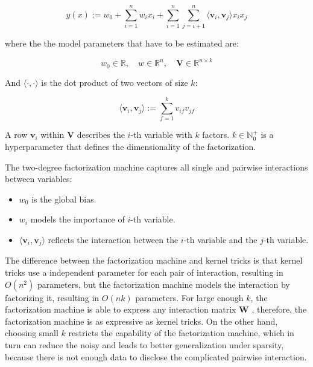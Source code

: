         \begin{equation}
        y(x) := w_0 + \sum_{i=1}^n w_i x_i + \sum_{i=1}^n\sum_{j=i+1}^n \langle \bm{v}_i, \bm{v}_j \rangle x_ix_j
        \label{eq:fm}
        \end{equation}

        where the the model parameters that have to be estimated are:

        \[
        w_0 \in \mathbb{R}, \quad w \in \mathbb{R}^n, \quad \bm{V} \in \mathbb{R}^{n \times k}
        \]

        And $\langle \cdot, \cdot \rangle$ is the dot product of two vectors of size $k$:

        \[
        \langle \bm{v}_i, \bm{v}_j \rangle := \sum_{f=1}^k v_{if}v_{jf}
        \]

        A row $\bm{v}_i$ within $\bm{V}$ describes the $i$-th variable with $k$ factors.
        $k \in \mathbb{N}_0^+$ is a hyperparameter that defines the dimensionality of the factorization.

        The two-degree factorization machine captures all single and pairwise interactions between variables:

        \begin{itemize}
            \item $w_0$ is the global bias.
            \item $w_i$ models the importance of $i$-th variable.
            \item $\langle \bm{v}_i, \bm{v}_j \rangle$ reflects the interaction
                between the $i$-th variable and the $j$-th variable.
        \end{itemize}

        The difference between the factorization machine and kernel tricks is that
        kernel tricks use a independent parameter for each pair of interaction, resulting in $O(n^2)$ parameters,
        but the factorization machine models the interaction by factorizing it, resulting in $O(nk)$ parameters.
        For large enough $k$, the factorization machine is able to express any interaction matrix $\bm{W}$ \cite{Rendle2010},
        therefore, the factorization machine is as expressive as kernel tricks.
        On the other hand, choosing small $k$ restricts the capability of the factorization machine,
        which in turn can reduce the noisy and leads to better generalization under sparsity,
        because there is not enough data to disclose the complicated pairwise interaction.

